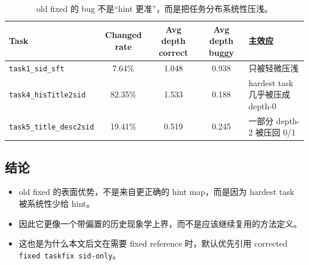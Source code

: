 \begin{table}[H]
\centering
\small
\setlength{\tabcolsep}{4pt}
\begin{tabular}{p{3.2cm} c c c p{4.1cm}}
\toprule
Task & Changed rate & Avg depth correct & Avg depth buggy & 主效应 \\
\midrule
\texttt{task1\_sid\_sft} & 7.64\% & 1.048 & 0.938 & 只被轻微压浅 \\
\texttt{task4\_hisTitle2sid} & 82.35\% & 1.533 & 0.188 & hardest task 几乎被压成 depth-0 \\
\texttt{task5\_title\_desc2sid} & 19.41\% & 0.519 & 0.245 & 一部分 depth-2 被压回 0/1 \\
\bottomrule
\end{tabular}
\caption{old fixed 的 bug 不是“hint 更准”，而是把任务分布系统性压浅。}
\end{table}

\subsection{结论}

\begin{itemize}
\item old fixed 的表面优势，不是来自更正确的 hint map，而是因为 hardest task 被系统性少给 hint。
\item 因此它更像一个带偏置的历史现象学上界，而不是应该继续复用的方法定义。
\item 这也是为什么本文后文在需要 fixed reference 时，默认优先引用 corrected \texttt{fixed taskfix sid-only}。
\end{itemize}
